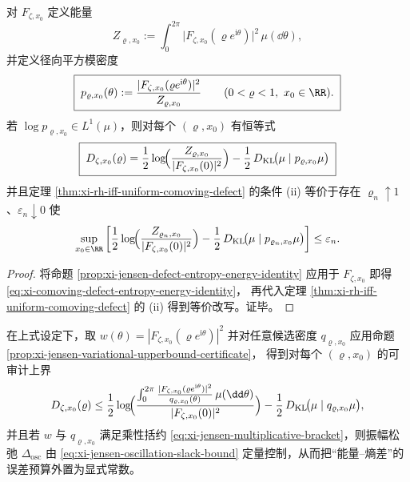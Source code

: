 \begin{corollary}[共动缺陷判据的熵化表述]\label{cor:xi-rh-criterion-entropy-energy-rewrite}
对 \(F_{\zeta,x_0}\) 定义能量
\[
Z_{\varrho,x_0}:=\int_{0}^{2\pi}\bigl|F_{\zeta,x_0}(\varrho e^{\mathrm{i}\theta})\bigr|^2\,\mu(\dd\theta),
\]
并定义径向平方模密度
\begin{equation}\label{eq:xi-comoving-radial-squaremod-density}
\boxed{\;
p_{\varrho,x_0}(\theta):=\frac{|F_{\zeta,x_0}(\varrho e^{\mathrm{i}\theta})|^2}{Z_{\varrho,x_0}}\qquad(0<\varrho<1,\ x_0\in\RR).\;}
\end{equation}
若 \(\log p_{\varrho,x_0}\in L^1(\mu)\)，则对每个 \((\varrho,x_0)\) 有恒等式
\begin{equation}\label{eq:xi-comoving-defect-entropy-energy-identity}
\boxed{\;
D_{\zeta,x_0}(\varrho)
=\frac12\log\!\Bigl(\frac{Z_{\varrho,x_0}}{|F_{\zeta,x_0}(0)|^2}\Bigr)
-\frac12\,D_{\mathrm{KL}}\!\bigl(\mu\mid p_{\varrho,x_0}\mu\bigr)\;}
\end{equation}
并且定理 \ref{thm:xi-rh-iff-uniform-comoving-defect} 的条件 (ii) 等价于存在 \(\varrho_n\uparrow 1\)、\(\varepsilon_n\downarrow 0\) 使
\[
\sup_{x_0\in\RR}
\left[
\frac12\log\!\Bigl(\frac{Z_{\varrho_n,x_0}}{|F_{\zeta,x_0}(0)|^2}\Bigr)
-\frac12\,D_{\mathrm{KL}}\!\bigl(\mu\mid p_{\varrho_n,x_0}\mu\bigr)
\right]\le \varepsilon_n.
\]
\end{corollary}

\begin{proof}
将命题 \ref{prop:xi-jensen-defect-entropy-energy-identity} 应用于 \(F_{\zeta,x_0}\) 即得 \eqref{eq:xi-comoving-defect-entropy-energy-identity}，
再代入定理 \ref{thm:xi-rh-iff-uniform-comoving-defect} 的 (ii) 得到等价改写。证毕。
\end{proof}

\begin{remark}[候选密度的证书接口]\label{rem:xi-jensen-entropy-certificate-interface}
在上式设定下，取
\(
w(\theta)=|F_{\zeta,x_0}(\varrho e^{\mathrm{i}\theta})|^2
\)
并对任意候选密度 \(q_{\varrho,x_0}\) 应用命题 \ref{prop:xi-jensen-variational-upperbound-certificate}，
得到对每个 \((\varrho,x_0)\) 的可审计上界
\[
D_{\zeta,x_0}(\varrho)
\le
\frac12\log\!\Bigl(\frac{\int_0^{2\pi}\frac{|F_{\zeta,x_0}(\varrho e^{\mathrm{i}\theta})|^2}{q_{\varrho,x_0}(\theta)}\,\mu(\dd\theta)}{|F_{\zeta,x_0}(0)|^2}\Bigr)
-\frac12\,D_{\mathrm{KL}}\!\bigl(\mu\mid q_{\varrho,x_0}\mu\bigr),
\]
并且若 \(w\) 与 \(q_{\varrho,x_0}\) 满足乘性括约 \eqref{eq:xi-jensen-multiplicative-bracket}，则振幅松弛 \(\Delta_{\mathrm{osc}}\) 由 \eqref{eq:xi-jensen-oscillation-slack-bound} 定量控制，从而把“能量--熵差”的误差预算外置为显式常数。
\end{remark}

